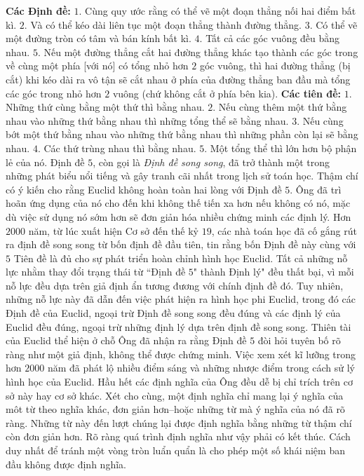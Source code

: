 \begin{multicols}{2}
	\vskip 0.1cm
	\textbf{\color{lichsutoanhoc}Các Định đề:}
	\vskip 0.1cm
	$1.$ Cùng quy ước rằng có thể vẽ một đoạn thẳng nối hai điểm bất kì.
	\vskip 0.1cm
	$2.$ Và có thể kéo dài liên tục một đoạn thẳng thành đường thẳng.
	\vskip 0.1cm
	$3.$ Có thể vẽ một đường tròn có tâm và bán kính bất kì.
	\vskip 0.1cm
	$4.$ Tất cả các góc vuông đều bằng nhau.
	\vskip 0.1cm
	$5.$ Nếu một đường thẳng cắt hai đường thẳng khác tạo thành các góc trong về cùng một phía [với nó] có tổng nhỏ hơn $2$ góc vuông, thì hai đường thẳng (bị cắt) khi kéo dài ra vô tận sẽ cắt nhau ở phía của đường thẳng ban đầu mà tổng các góc trong nhỏ hơn $2$ vuông (chứ không cắt ở phía bên kia). 
	\vskip 0.1cm
	\textbf{\color{lichsutoanhoc}Các tiên đề:}
	\vskip 0.1cm
	$1.$ Những thứ cùng bằng một thứ thì bằng nhau.
	\vskip 0.1cm
	$2.$ Nếu cùng thêm một thứ bằng nhau vào những thứ bằng nhau thì những tổng thể sẽ bằng nhau.
	\vskip 0.1cm
	$3.$ Nếu cùng bớt một thứ bằng nhau vào những thứ bằng nhau thì những phần còn lại sẽ bằng nhau.
	\vskip 0.1cm
	$4.$ Các thứ trùng nhau thì bằng nhau.
	\vskip 0.1cm
	$5.$ Một tổng thể thì lớn hơn bộ phận lẻ của nó.
	\vskip 0.1cm
	Định đề $5$, còn gọi là \textit{Định đề song song}, đã trở thành một trong những phát biểu nổi tiếng và gây tranh cãi nhất trong lịch sử toán học. Thậm chí có ý kiến cho rằng Euclid không hoàn toàn hai lòng với Định đề $5$. Ông đã trì hoãn ứng dụng của nó cho đến khi không thế tiến xa hơn nếu không có nó, mặc dù việc sử dụng nó sớm hơn sẽ đơn giản hóa nhiều chứng minh các định lý.
	\vskip 0.1cm
	Hơn $2000$ năm, từ lúc xuất hiện Cơ sở đến thế kỷ $19$, các nhà toán học đã cố gắng rút ra định đề song song từ bốn định đề đầu tiên, tin rằng bốn Định đề này cùng với $5$ Tiên đề là đủ cho sự phát triển hoàn chỉnh hình học Euclid. Tất cả những nỗ lực nhằm thay đổi trạng thái từ ``Định đề $5$" thành Định lý" đều thất bại, vì mỗi nỗ lực đều dựa trên giả định ẩn tương đương với chính định đề đó. 
	\vskip 0.1cm
	Tuy nhiên, những nỗ lực này đã dẫn đến việc phát hiện ra hình học phi Euclid, trong đó các Định đề của Euclid, ngoại trừ Định đề song song đều đúng và các định lý của Euclid đều đúng, ngoại trừ những định lý dựa trên định đề song song. Thiên tài của Euclid thể hiện ở chỗ Ông đã nhận ra rằng Định đề $5$ đòi hỏi tuyên bố rõ ràng như một giả định, không thể được chứng minh.   
	\vskip 0.1cm
	Việc xem xét kĩ lưỡng trong hơn $2000$ năm đã phát lộ nhiều điểm sáng và những nhược điểm trong cách sử lý hình học của Euclid. Hầu hết các định nghĩa của Ông đều dễ bị chỉ trích trên cơ sở này hay cơ sở khác. Xét cho cùng, một định nghĩa chỉ mang lại ý nghĩa của môt từ theo nghĩa khác, đơn giản hơn--hoặc những từ mà ý nghĩa của nó đã rõ ràng. Những từ này đến lượt chúng lại được định nghĩa bằng những từ thậm chí còn đơn giản hơn. Rõ ràng quá trình định nghĩa như vậy phải có kết thúc. Cách duy nhất để tránh một vòng tròn luẩn quẩn là cho phép một số khái niệm ban đầu không được định nghĩa.

\end{multicols}
